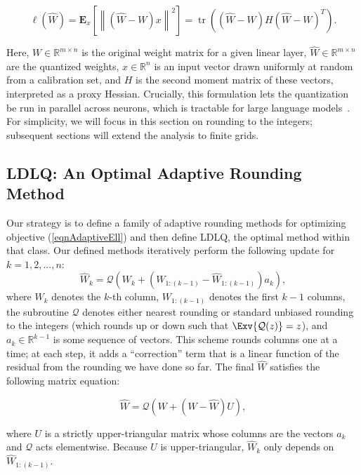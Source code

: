 \begin{equation}
    \label{eqnAdaptiveEll}
    \textstyle
    \ell(\hat W)
    =
    \mathbf{E}_x\left[ \left\| (\hat W - W) x \right\|^2 \right]
    =
    \operatorname{tr}\left( (\hat W - W) H (\hat W - W)^T \right).
\end{equation}

Here, $W \in \mathbb{R}^{m \times n}$ is the original weight matrix for a given linear layer, $\hat W \in \mathbb{R}^{m \times n}$ are the quantized weights, $x \in \mathbb{R}^n$ is an input vector drawn uniformly at random from a calibration set, and $H$ is the second moment matrix of these vectors, interpreted as a proxy Hessian. Crucially, this formulation lets the quantization be run in parallel across neurons, which is tractable for large language models~\citep{frantar2023gptq}. For simplicity, we will focus in this section on rounding to the integers; subsequent sections will extend the analysis to finite grids.

\subsection{LDLQ: An Optimal Adaptive Rounding Method} Our strategy is to define a family of adaptive rounding methods for optimizing objective (\ref{eqnAdaptiveEll}) and then define LDLQ, the optimal method within that class. Our defined methods iteratively perform the following update for $k=1,2,...,n$:
\[
    \hat W_k = \mathcal{Q}( W_k + (W_{1:(k-1)} - \hat W_{1:(k-1)}) a_k),
\]
where $W_k$ denotes the $k$-th column, $W_{1:(k-1)}$ denotes the first $k-1$ columns, the subroutine $\mathcal{Q}$ denotes either nearest rounding or standard unbiased rounding to the integers (which rounds up or down such that $\Exv{\mathcal{Q}(z)} = z$), and $a_k \in \mathbb{R}^{k - 1}$ is some sequence of vectors. This scheme rounds columns one at a time; at each step, it adds a ``correction'' term that is a linear function of the residual from the rounding we have done so far. The final $\hat W$ satisfies the following matrix equation:

\begin{equation}
  \label{eqnVectorQuant}
  \hat W = \mathcal{Q}( W + (W - \hat W) U),  
\end{equation}

 
where $U$ is a strictly upper-triangular matrix whose columns are the vectors $a_k$ and $\mathcal{Q}$ acts elementwise. Because $U$ is upper-triangular, $\hat W_k$ only depends on $\hat W_{1:(k-1)}$.

